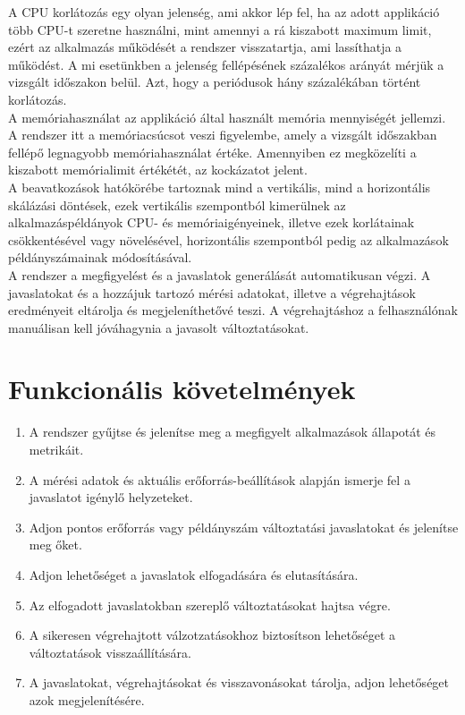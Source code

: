 A CPU korlátozás egy olyan jelenség, ami akkor lép fel,
ha az adott applikáció több CPU-t szeretne használni, mint amennyi a rá kiszabott maximum limit,
ezért az alkalmazás működését a rendszer visszatartja, ami lassíthatja a működést.
A mi esetünkben a jelenség fellépésének százalékos arányát mérjük a vizsgált időszakon belül.
Azt, hogy a periódusok hány százalékában történt korlátozás.\\

A memóriahasználat az applikáció által használt memória mennyiségét jellemzi.
A rendszer itt a memóriacsúcsot veszi figyelembe, amely a vizsgált időszakban
fellépő legnagyobb memóriahasználat értéke. Amennyiben ez megközelíti a kiszabott
memórialimit értékétét, az kockázatot jelent.\\

A beavatkozások hatókörébe tartoznak mind a vertikális, mind a horizontális skálázási döntések,
ezek vertikális szempontból kimerülnek az alkalmazáspéldányok CPU- és memóriaigényeinek,
illetve ezek korlátainak csökkentésével vagy növelésével, horizontális szempontból pedig
az alkalmazások példányszámainak módosításával.\\

A rendszer a megfigyelést és a javaslatok generálását automatikusan végzi. A javaslatokat és a hozzájuk tartozó
mérési adatokat, illetve a végrehajtások eredményeit eltárolja és megjeleníthetővé teszi.
A végrehajtáshoz a felhasználónak manuálisan kell jóváhagynia a javasolt változtatásokat.

\section{Funkcionális követelmények}
\begin{enumerate}
    \item A rendszer gyűjtse és jelenítse meg a megfigyelt alkalmazások állapotát és metrikáit.
    \item A mérési adatok és aktuális erőforrás-beállítások alapján ismerje fel a javaslatot igénylő helyzeteket.
    \item Adjon pontos erőforrás vagy példányszám változtatási javaslatokat és jelenítse meg őket.
    \item Adjon lehetőséget a javaslatok elfogadására és elutasítására.
    \item Az elfogadott javaslatokban szereplő változtatásokat hajtsa végre.
    \item A sikeresen végrehajtott válzotzatásokhoz biztosítson lehetőséget a változtatások visszaállítására.
    \item A javaslatokat, végrehajtásokat és visszavonásokat tárolja, adjon lehetőséget azok megjelenítésére.
\end{enumerate}

